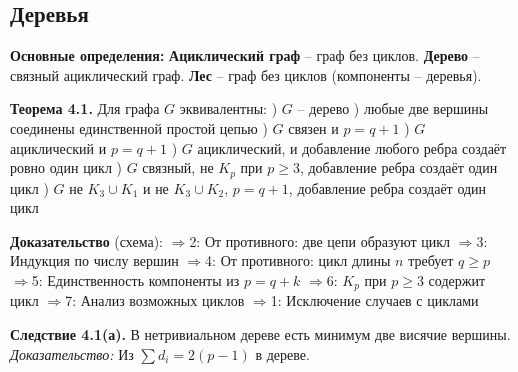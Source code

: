 \subsection{Деревья}

\noindent\textbf{Основные определения:}
\noindent\textbf{Ациклический граф} -- граф без циклов.
\noindent\textbf{Дерево} -- связный ациклический граф.
\noindent\textbf{Лес} -- граф без циклов (компоненты -- деревья).

\noindent\textbf{Теорема 4.1.} Для графа $G$ эквивалентны:
) $G$ -- дерево
) любые две вершины соединены единственной простой цепью
) $G$ связен и $p = q + 1$
) $G$ ациклический и $p = q + 1$
) $G$ ациклический, и добавление любого ребра создаёт ровно один цикл
) $G$ связный, не $K_p$ при $p \geq 3$, добавление ребра создаёт один цикл
) $G$ не $K_3 \cup K_1$ и не $K_3 \cup K_2$, $p = q + 1$, добавление ребра создаёт один цикл

\noindent\textbf{Доказательство} (схема):
$\Rightarrow$2: От противного: две цепи образуют цикл
$\Rightarrow$3: Индукция по числу вершин
$\Rightarrow$4: От противного: цикл длины $n$ требует $q \geq p$
$\Rightarrow$5: Единственность компоненты из $p = q + k$
$\Rightarrow$6: $K_p$ при $p \geq 3$ содержит цикл
$\Rightarrow$7: Анализ возможных циклов
$\Rightarrow$1: Исключение случаев с циклами

\noindent\textbf{Следствие 4.1(а).} В нетривиальном дереве есть минимум две висячие вершины.
\noindent\textit{Доказательство:} Из $\sum d_i = 2(p-1)$ в дереве.